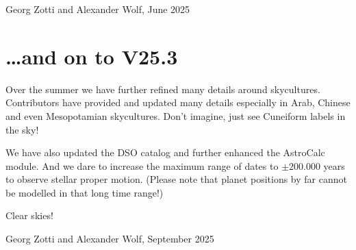 \begin{flushright}
Georg Zotti and Alexander Wolf, June 2025
\end{flushright}

\vspace{2\baselineskip}

\section*{\ldots and on to V25.3}
Over the summer we have further refined many details around skycultures. 
Contributors have provided and updated many details especially in Arab, Chinese and even Mesopotamian skycultures. 
Don't imagine, just see Cuneiform labels in the sky!

We have also updated the DSO catalog and further enhanced the AstroCalc module. 
And we dare to increase the maximum range of dates to $\pm 200.000$ years to observe stellar proper motion. 
(Please note that planet positions by far cannot be modelled in that long time range!)

Clear skies!

\begin{flushright}
Georg Zotti and Alexander Wolf, September 2025
\end{flushright}



